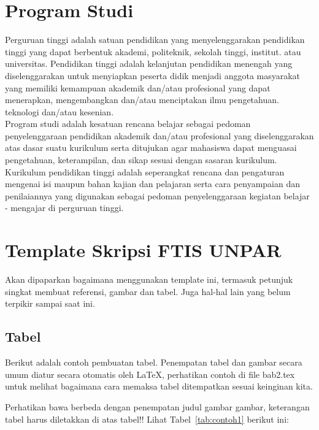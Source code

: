 \section{Program Studi}
\label{sec:program studi} 
Perguruan tinggi adalah satuan pendidikan yang menyelenggarakan pendidikan tinggi yang dapat berbentuk akademi, politeknik, sekolah tinggi, institut. atau universitas. Pendidikan tinggi adalah kelanjutan pendidikan menengah yang
diselenggarakan untuk menyiapkan peserta didik menjadi anggota masyarakat yang memiliki kemampuan akademik dan/atau profesional yang dapat menerapkan, mengembangkan dan/atau menciptakan ilmu pengetahuan. teknologi dan/atau kesenian. \\ %

Program studi adalah kesatuan rencana belajar sebagai pedoman penyelenggaraan pendidikan akademik dan/atau profesional yang diselenggarakan atas dasar suatu kurikulum serta ditujukan agar mahasiswa dapat menguasai pengetahuan, keterampilan, dan sikap sesuai dengan sasaran kurikulum. Kurikulum pendidikan tinggi adalah seperangkat rencana dan pengaturan mengenai isi maupun bahan kajian dan pelajaran serta cara penyampaian dan penilaiannya yang digunakan sebagai pedoman penyelenggaraan kegiatan belajar - mengajar di perguruan tinggi. \\ %



\section{Template Skripsi FTIS UNPAR}
\label{sec:template}
 
Akan dipaparkan bagaimana menggunakan template ini, termasuk petunjuk singkat membuat referensi, gambar dan tabel.
Juga hal-hal lain yang belum terpikir sampai saat ini. 
 

\subsection{Tabel}  
Berikut adalah contoh pembuatan tabel. 
Penempatan tabel dan gambar secara umum diatur secara otomatis oleh \LaTeX{}, perhatikan contoh di file bab2.tex untuk melihat bagaimana cara memaksa tabel ditempatkan sesuai keinginan kita.

Perhatikan bawa berbeda dengan penempatan judul gambar gambar, keterangan tabel harus diletakkan di atas tabel!!
Lihat Tabel~\ref{tab:contoh1} berikut ini:

